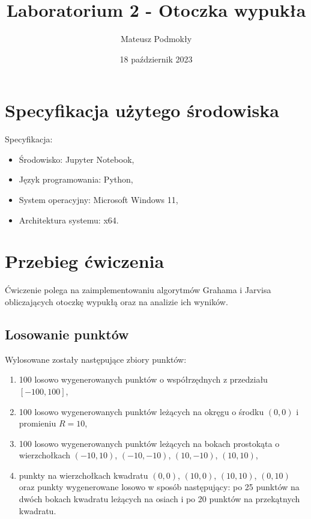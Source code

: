 \documentclass[11pt]{scrartcl}
\title{Laboratorium 2 - Otoczka wypukła}
\author{Mateusz Podmokły}
\date{18 październik 2023}
\begin{document}
    \maketitle
    \section{Specyfikacja użytego środowiska}
    Specyfikacja:

    \begin{itemize}
        \item Środowisko: Jupyter Notebook,
        \item Język programowania: Python,
        \item System operacyjny: Microsoft Windows 11,
        \item Architektura systemu: x64.
    \end{itemize}
    \section{Przebieg ćwiczenia}

    Ćwiczenie polega na zaimplementowaniu algorytmów Grahama i Jarvisa obliczających
    otoczkę wypukłą oraz na analizie ich wyników.

    \subsection{Losowanie punktów}

    Wylosowane zostały następujące zbiory punktów:

    \begin{enumerate}
        \item 100 losowo wygenerowanych punktów o współrzędnych z przedziału
        \([-100,100]\),
        \item 100 losowo wygenerowanych punktów leżących na okręgu o środku
        \((0,0)\) i promieniu $R=10$,
        \item 100 losowo wygenerowanych punktów leżących na bokach prostokąta
        o wierzchołkach $(-10, 10)$, $(-10,-10)$, $(10,-10)$, $(10,10)$,
        \item punkty na wierzchołkach kwadratu $(0, 0)$, $(10, 0)$, $(10, 10)$,
        $(0, 10)$ oraz punkty wygenerowane losowo w sposób następujący: po 25 punktów na
        dwóch bokach kwadratu leżących na osiach i po 20 punktów na przekątnych kwadratu. 
    \end{enumerate}
\end{document}
